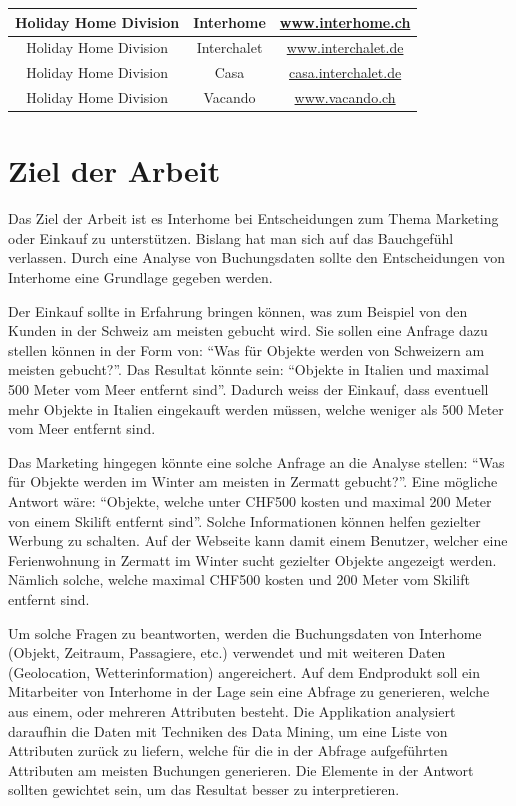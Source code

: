 \begin{table}[h]
\begin{tabular}{ | c | c | c |}
		Holiday Home Division & Interhome & \href{http://www.interhome.ch}{www.interhome.ch} \\ \hline 
		Holiday Home Division & Interchalet & \href{http://www.interchalet.de}{www.interchalet.de} \\ \hline 
		Holiday Home Division & Casa & \href{http://casa.interchalet.de}{casa.interchalet.de} \\ \hline 
		Holiday Home Division & Vacando & \href{http://www.vacando.ch}{www.vacando.ch} \\ \hline 
	\end{tabular}
\end{table}

\section{Ziel der Arbeit}
\label{sec:einleitung:ziel}
Das Ziel der Arbeit ist es Interhome bei Entscheidungen zum Thema Marketing oder Einkauf zu unterstützen. Bislang hat man sich auf das Bauchgefühl verlassen. Durch eine Analyse von Buchungsdaten sollte den Entscheidungen von Interhome eine Grundlage gegeben werden. 

Der Einkauf sollte in Erfahrung bringen können, was zum Beispiel von den Kunden in der Schweiz am meisten gebucht wird. Sie sollen eine Anfrage dazu stellen können in der Form von: "`Was für Objekte werden von Schweizern am meisten gebucht?"'. Das Resultat könnte sein: "`Objekte in Italien und maximal 500 Meter vom Meer entfernt sind"'. Dadurch weiss der Einkauf, dass eventuell mehr Objekte in Italien eingekauft werden müssen, welche weniger als 500 Meter vom Meer entfernt sind.

Das Marketing hingegen könnte eine solche Anfrage an die Analyse stellen: "`Was für Objekte werden im Winter am meisten in Zermatt gebucht?"'. Eine mögliche Antwort wäre: "`Objekte, welche unter CHF500 kosten und maximal 200 Meter von einem Skilift entfernt sind"'. Solche Informationen können helfen gezielter Werbung zu schalten. Auf der Webseite kann damit einem Benutzer, welcher eine Ferienwohnung in Zermatt im Winter sucht gezielter Objekte angezeigt werden. Nämlich solche, welche maximal CHF500 kosten und 200 Meter vom Skilift entfernt sind.

Um solche Fragen zu beantworten, werden die Buchungsdaten von Interhome (Objekt, Zeitraum, Passagiere, etc.) verwendet und mit weiteren Daten (Geolocation, Wetterinformation) angereichert. 
Auf dem Endprodukt soll ein Mitarbeiter von Interhome in der Lage sein eine Abfrage zu generieren, welche aus einem, oder mehreren Attributen besteht. Die Applikation analysiert daraufhin die Daten mit Techniken des Data Mining, um eine Liste von Attributen zurück zu liefern, welche für die in der Abfrage aufgeführten Attributen am meisten Buchungen generieren. Die Elemente in der Antwort sollten gewichtet sein, um das Resultat besser zu interpretieren.

